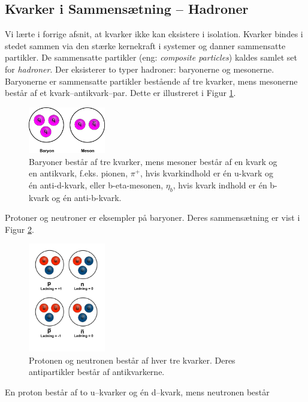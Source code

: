 \subsection{Kvarker i Sammensætning -- Hadroner}
\label{sec:hadron}
Vi lærte i forrige afsnit, at kvarker ikke kan eksistere i
isolation. Kvarker bindes i stedet sammen via den stærke kernekraft i
systemer og danner sammensatte partikler. De sammensatte partikler
(eng: \emph{composite particles}) kaldes samlet set for
\emph{hadroner}.  Der eksisterer to typer hadroner: baryonerne og
mesonerne. Baryonerne er sammensatte partikler bestående af tre
kvarker, mens mesonerne består af et kvark--antikvark--par. Dette er
illustreret i Figur \ref{fig:baryonmeson}.
\begin{figure}[htb]
  \centering
  \includegraphics[width=0.3\textwidth]{KernePartikel/fig_p/baryonmeson.png}
  \caption{ Baryoner består af tre kvarker, mens mesoner
      består af en kvark og en antikvark, f.eks. pionen, $\pi^+$, hvis
      kvarkindhold er én u-kvark og én anti-d-kvark, eller
      b-eta-mesonen, $\eta_b$, hvis kvark indhold er én b-kvark og én
      anti-b-kvark.}
    \label{fig:baryonmeson}
\end{figure}
Protoner og neutroner er eksempler på baryoner. Deres sammensætning er
vist i Figur \ref{fig:protonneutron}.
\begin{figure}[htb]
  \centering
  \includegraphics[width=0.3\textwidth]{KernePartikel/fig_p/composite.png}
  \caption{ Protonen og neutronen består af hver tre
      kvarker. Deres antipartikler består af antikvarkerne.}
  \label{fig:protonneutron}
\end{figure}
En proton består af to u--kvarker og én d--kvark, mens neutronen består
